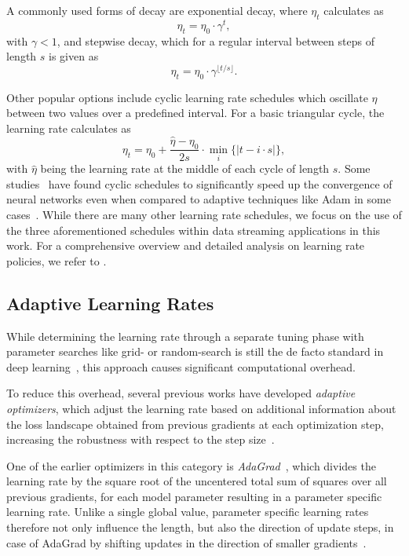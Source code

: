 \documentclass[letterpaper]{article} %
\begin{document}
A commonly used forms of decay are exponential decay, where $\eta_{t}$ calculates as
\begin{equation}
	\eta_{t} = \eta_0 \cdot \gamma^t,
\end{equation}
with $\gamma < 1$, and stepwise decay, which for a regular interval between steps of length $s$ is given as
\begin{equation}
	\eta_{t} = \eta_0 \cdot \gamma^{\lfloor t/s \rfloor}.
\end{equation}

Other popular options include cyclic learning rate schedules which oscillate $\eta$ between two values over a predefined interval.
For a basic triangular cycle, the learning rate calculates as
\begin{equation}
	\eta_t = \eta_0 + \frac{\hat{\eta} - \eta_0}{2s} \cdot \min_{i} \{|t-i\cdot s|\},
\end{equation}
with $\hat{\eta}$ being the learning rate at the middle of each cycle of length $s$.
Some studies~\cite{smithCyclicalLearningRates2017, smithSuperConvergenceVeryFast2018a} have found cyclic schedules to significantly speed up the convergence of neural networks even when compared to adaptive techniques like Adam in some cases~\cite{kingmaAdamMethodStochastic2017b}.
While there are many other learning rate schedules, we focus on the use of the three aforementioned schedules within data streaming applications in this work.
For a comprehensive overview and detailed analysis on learning rate policies, we refer to \citet{wuDemystifyingLearningRate2019b}.

\subsection{Adaptive Learning Rates}

While determining the learning rate through a separate tuning phase with parameter searches like grid- or random-search is still the de facto standard in deep learning~\cite{defazioLearningRateFreeLearningDAdaptation2023a}, this approach causes significant computational overhead.

To reduce this overhead, several previous works have developed \textit{adaptive optimizers}, which adjust the learning rate based on additional information about the loss landscape obtained from previous gradients at each optimization step, increasing the robustness with respect to the step size~\cite{duchiAdaptiveSubgradientMethods2011}.

One of the earlier optimizers in this category is \textit{AdaGrad}~\cite{duchiAdaptiveSubgradientMethods2011}, which divides the learning rate by the square root of the uncentered total sum of squares over all previous gradients, for each model parameter resulting in a parameter specific learning rate.
Unlike a single global value, parameter specific learning rates therefore not only influence the length, but also the direction of update steps, in case of AdaGrad by shifting updates in the direction of smaller gradients~\cite{wuWNGradLearnLearning2020}. %
\end{document}
